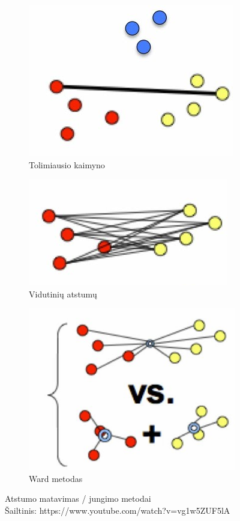 \documentclass{VUMIFInfBakalaurinis}
\begin{document}
\begin{itemize}
  \begin{figure}[!ht]
    \centering
    \begin{subfigure}[b]{.3\textwidth}
      \includegraphics[scale=1]{img/complete}
      \centering
      \caption{Tolimiausio kaimyno}
    \end{subfigure}
    \begin{subfigure}[b]{.3\textwidth}
      \includegraphics[scale=1]{img/average}
      \centering
      \caption{Vidutinių atstumų}
    \end{subfigure}
    \begin{subfigure}[b]{.3\textwidth}
      \includegraphics[scale=1]{img/ward}
      \centering
      \caption{Ward metodas}
    \end{subfigure}
    \caption{Atstumo matavimas / jungimo metodai\\
             Šailtinis: https://www.youtube.com/watch?v=vg1w5ZUF5lA}
  \end{figure}


\end{itemize}
\end{document}
